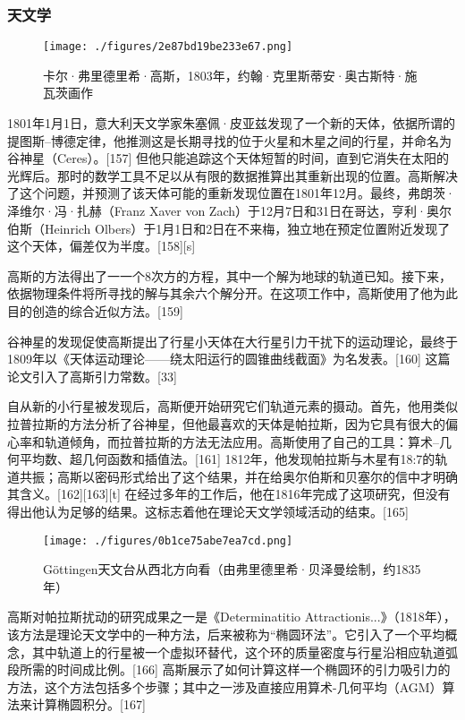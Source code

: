 \subsubsection{天文学}
\begin{figure}[ht]
\centering
\texttt{[image: ./figures/2e87bd19be233e67.png]}
\caption{卡尔·弗里德里希·高斯，1803年，约翰·克里斯蒂安·奥古斯特·施瓦茨画作} \label{fig_KRGS_14}
\end{figure}
1801年1月1日，意大利天文学家朱塞佩·皮亚兹发现了一个新的天体，依据所谓的提图斯–博德定律，他推测这是长期寻找的位于火星和木星之间的行星，并命名为谷神星（Ceres）。[157] 但他只能追踪这个天体短暂的时间，直到它消失在太阳的光辉后。那时的数学工具不足以从有限的数据推算出其重新出现的位置。高斯解决了这个问题，并预测了该天体可能的重新发现位置在1801年12月。最终，弗朗茨·泽维尔·冯·扎赫（Franz Xaver von Zach）于12月7日和31日在哥达，亨利·奥尔伯斯（Heinrich Olbers）于1月1日和2日在不来梅，独立地在预定位置附近发现了这个天体，偏差仅为半度。[158][s]

高斯的方法得出了一一个8次方的方程，其中一个解为地球的轨道已知。接下来，依据物理条件将所寻找的解与其余六个解分开。在这项工作中，高斯使用了他为此目的创造的综合近似方法。[159]

谷神星的发现促使高斯提出了行星小天体在大行星引力干扰下的运动理论，最终于1809年以《天体运动理论——绕太阳运行的圆锥曲线截面》为名发表。[160] 这篇论文引入了高斯引力常数。[33]

自从新的小行星被发现后，高斯便开始研究它们轨道元素的摄动。首先，他用类似拉普拉斯的方法分析了谷神星，但他最喜欢的天体是帕拉斯，因为它具有很大的偏心率和轨道倾角，而拉普拉斯的方法无法应用。高斯使用了自己的工具：算术–几何平均数、超几何函数和插值法。[161] 1812年，他发现帕拉斯与木星有18:7的轨道共振；高斯以密码形式给出了这个结果，并在给奥尔伯斯和贝塞尔的信中才明确其含义。[162][163][t] 在经过多年的工作后，他在1816年完成了这项研究，但没有得出他认为足够的结果。这标志着他在理论天文学领域活动的结束。[165]
\begin{figure}[ht]
\centering
\texttt{[image: ./figures/0b1ce75abe7ea7cd.png]}
\caption{ Göttingen天文台从西北方向看（由弗里德里希·贝泽曼绘制，约1835年）} \label{fig_KRGS_15}
\end{figure}
高斯对帕拉斯扰动的研究成果之一是《Determinatitio Attractionis...》（1818年），该方法是理论天文学中的一种方法，后来被称为“椭圆环法”。它引入了一个平均概念，其中轨道上的行星被一个虚拟环替代，这个环的质量密度与行星沿相应轨道弧段所需的时间成比例。[166] 高斯展示了如何计算这样一个椭圆环的引力吸引力的方法，这个方法包括多个步骤；其中之一涉及直接应用算术-几何平均（AGM）算法来计算椭圆积分。[167]

